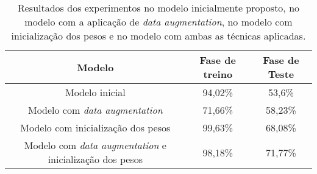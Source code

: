 \begin{table}[H]
    \centering
    \caption{Resultados dos experimentos no modelo inicialmente proposto, no modelo com a aplicação de \textit{data augmentation}, no modelo com inicialização dos pesos e no modelo com ambas as técnicas aplicadas.
    \label{tab:resultado2}}
    \begin{tabular}{ccc}
        \toprule
            Modelo & Fase de treino & Fase de Teste \\
        \midrule
            Modelo inicial & 94,02\% & 53,6\%  \\
            Modelo com \textit{data augmentation} & 71,66\% & 58,23\%  \\
            Modelo com inicialização dos pesos & 99,63\% & 68,08\%  \\
            Modelo com \textit{data augmentation} e inicialização dos pesos & 98,18\% & 71,77\%  \\
        \bottomrule
    \end{tabular}
\end{table}
